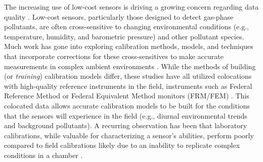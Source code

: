 \documentclass[journal abbreviation, manuscript]{copernicus}
\begin{document}
The increasing use of low-cost sensors is driving a growing concern regarding data quality \citep{Clements2017}. Low-cost sensors, particularly those designed to detect gas-phase pollutants, are often cross-sensitive to changing environmental conditions (e.g., temperature, humidity, and barometric pressure) and other pollutant species.  Much work has gone into exploring calibration methods, models, and techniques that incorporate corrections for these cross-sensitives to make accurate measurements in complex ambient environments \citep{Spinelle2014, Spinelle2015, SPINELLE2017706, Cross2017, Sadighi2018, Zimmerman2018}. While the methods of building (or \textit{training}) calibration models differ, these studies have all utilized colocations with high-quality reference instruments in the field, instruments such as Federal Reference Method or Federal Equivalent Method monitors (FRM/FEM) \citep{Spinelle2014, Spinelle2015, SPINELLE2017706, Cross2017, Sadighi2018, Zimmerman2018}. This colocated data allows accurate calibration models to be built for the conditions that the sensors will experience in the field (e.g., diurnal environmental trends and background pollutants). A recurring observation has been that laboratory calibrations, while valuable for characterizing a sensor’s abilities, perform poorly compared to field calibrations likely due to an inability to replicate complex conditions in a chamber \citep{Piedrahita2014, Castell2017}.  
\end{document}
